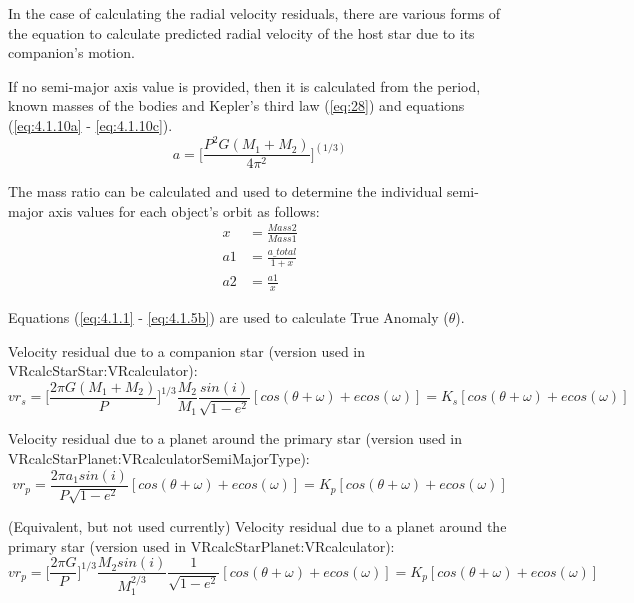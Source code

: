 \documentclass[10pt,preprint]{aastex}
\begin{document}
In the case of calculating the radial velocity residuals, there are various forms of the equation to calculate predicted radial velocity of the host star due to its companion's motion.

If no semi-major axis value is provided, then it is calculated from the period, known masses of the bodies and Kepler's third law (\ref{eq:28}) and equations (\ref{eq:4.1.10a} - \ref{eq:4.1.10c}).
\begin{equation}\label{eq:28}
a = \bigg[\frac{P^2G(M_1+M_2)}{4\pi^2} \bigg]^{(1/3)}
\end{equation}

The mass ratio can be calculated and used to determine the individual semi-major axis values for each object's orbit as follows:
\begin{subequations}
\begin{align}
\label{eq:4.1.10a}
x& = \frac{Mass2}{Mass1}\\
\label{eq:4.1.10b}
a1& = \frac{a\_total}{1+x}\\
\label{eq:4.1.10c}
a2& = \frac{a1}{x}
\end{align}
\end{subequations}

Equations (\ref{eq:4.1.1} - \ref{eq:4.1.5b}) are used to calculate True Anomaly ($\theta$).

Velocity residual due to a companion star (version used in VRcalcStarStar:VRcalculator):
\begin{equation}\label{eq:30}
vr_s = \bigg[\frac{2\pi G(M_1+M_2)}{P}\bigg]^{1/3}\frac{M_2}{M_1}\frac{sin(i)}{\sqrt{1-e^2}}[cos(\theta+\omega)+e cos(\omega)] = K_s[cos(\theta+\omega)+e cos(\omega)]
\end{equation}

Velocity residual due to a planet around the primary star (version used in VRcalcStarPlanet:VRcalculatorSemiMajorType):
\begin{equation}\label{eq:29}
vr_p = \frac{2\pi a_1sin(i)}{P\sqrt{1-e^2}}[cos(\theta+\omega)+e cos(\omega)]= K_p[cos(\theta+\omega)+e cos(\omega)]
\end{equation}

(Equivalent, but not used currently) Velocity residual due to a planet around the primary star (version used in VRcalcStarPlanet:VRcalculator):
\begin{equation}\label{eq:31}
vr_p = \bigg[\frac{2\pi G}{P}\bigg]^{1/3}\frac{M_2sin(i)}{M_1^{2/3}}\frac{1}{\sqrt{1-e^2}}[cos(\theta+\omega)+e cos(\omega)] = K_p[cos(\theta+\omega)+e cos(\omega)]
\end{equation}
\end{document}
